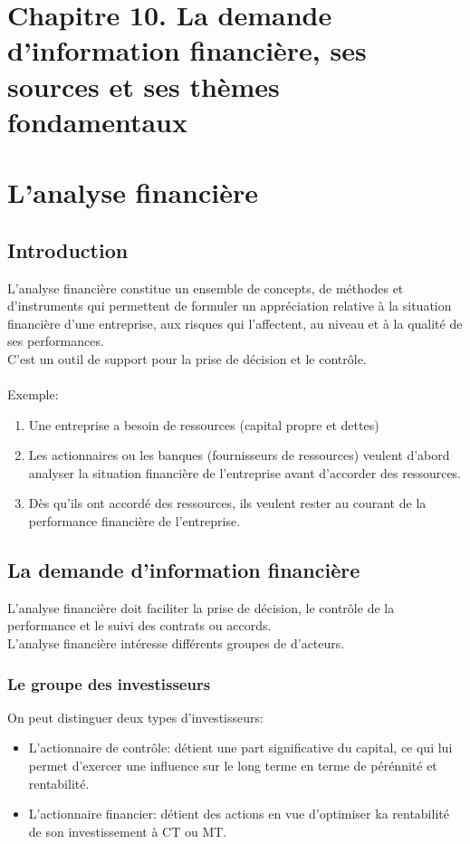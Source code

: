 \documentclass{article}
\begin{document}
\section*{Chapitre 10. La demande d'information financière, ses sources et ses thèmes fondamentaux}
\section{L'analyse financière}
\subsection{Introduction}
L'analyse financière constitue un ensemble de concepts, de méthodes et d'instruments qui permettent de formuler un appréciation relative à la situation financière d'une entreprise, aux risques qui l'affectent, au niveau et à la qualité de ses performances.  \\
C'est un outil de support pour la prise de décision et le contrôle. \\ \\
Exemple:
\begin{enumerate}
    \item Une entreprise a besoin de ressources (capital propre et dettes)
    \item Les actionnaires ou les banques (fournisseurs de ressources) veulent d'abord analyser la situation financière de l'entreprise avant d'accorder des ressources.
    \item Dès qu'ils ont accordé des ressources, ils veulent rester au courant de la performance financière de l'entreprise.
\end{enumerate}
\subsection{La demande d'information financière}
L'analyse financière doit faciliter la prise de décision, le contrôle de la performance et le suivi des contrats ou accords. \\
L'analyse financière intéresse différents groupes de d'acteurs.

\subsubsection*{Le groupe des investisseurs}
On peut distinguer deux types d'investisseurs:
\begin{itemize}
    \item L'actionnaire de contrôle: détient une part significative du capital, ce qui lui permet d'exercer une influence sur le long terme en terme de pérénnité et rentabilité.
    \item L'actionnaire financier: détient des actions en vue d'optimiser ka rentabilité de son investissement à CT ou MT.
\end{itemize}
\end{document}
